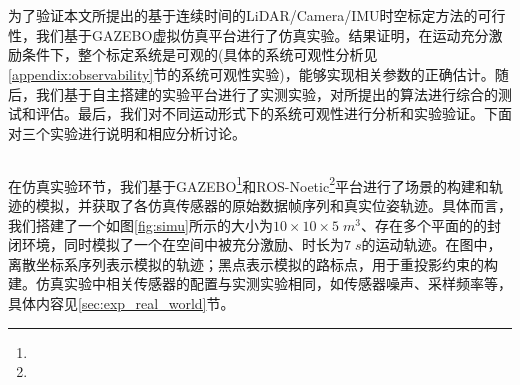 \chapter{}
为了验证本文所提出的基于连续时间的LiDAR/Camera/IMU时空标定方法的可行性，我们基于GAZEBO虚拟仿真平台进行了仿真实验。结果证明，在运动充分激励条件下，整个标定系统是可观的(具体的系统可观性分析见\ref{appendix:observability}节的系统可观性实验)，能够实现相关参数的正确估计。随后，我们基于自主搭建的实验平台进行了实测实验，对所提出的算法进行综合的测试和评估。最后，我们对不同运动形式下的系统可观性进行分析和实验验证。下面对三个实验进行说明和相应分析讨论。

\section{}

\subsection{}
\label{sec:exp_simu}
在仿真实验环节，我们基于GAZEBO\footnote{}和ROS-Noetic\footnote{}平台进行了场景的构建和轨迹的模拟，并获取了各仿真传感器的原始数据帧序列和真实位姿轨迹。具体而言，我们搭建了一个如图\ref{fig:simu}所示的大小为$10\times 10\times 5\; m^3$、存在多个平面的的封闭环境，同时模拟了一个在空间中被充分激励、时长为$7\;s$的运动轨迹。在图中，离散坐标系序列表示模拟的轨迹；黑点表示模拟的路标点，用于重投影约束的构建。仿真实验中相关传感器的配置与实测实验相同，如传感器噪声、采样频率等，具体内容见\ref{sec:exp_real_world}节。

